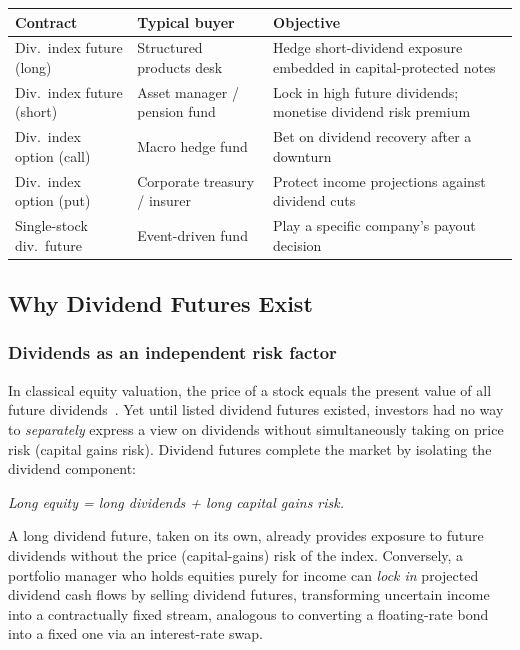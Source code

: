 \documentclass[12pt,a4paper]{article}
\begin{document}
\begin{center}
\small
\begin{tabular}{p{3.8cm}p{4.2cm}p{4.8cm}}
\toprule
\textbf{Contract} & \textbf{Typical buyer} & \textbf{Objective} \\
\midrule
Div.\ index future (long)
  & Structured products desk
  & Hedge short-dividend exposure embedded in capital-protected notes \\[3pt]
Div.\ index future (short)
  & Asset manager / pension fund
  & Lock in high future dividends; monetise dividend risk premium \\[3pt]
Div.\ index option (call)
  & Macro hedge fund
  & Bet on dividend recovery after a downturn \\[3pt]
Div.\ index option (put)
  & Corporate treasury / insurer
  & Protect income projections against dividend cuts \\[3pt]
Single-stock div.\ future
  & Event-driven fund
  & Play a specific company's payout decision \\
\bottomrule
\end{tabular}
\end{center}
 
\subsection*{Why Dividend Futures Exist}
 
\subsubsection*{Dividends as an independent risk factor}
 
In classical equity valuation, the price of a stock equals the present value of all
future dividends~\cite{hull}.
Yet until listed dividend futures existed, investors had no way to \emph{separately}
express a view on dividends without simultaneously taking on price risk (capital gains
risk).
Dividend futures complete the market by isolating the dividend component:
 
\smallskip
\textit{Long equity = long dividends + long capital gains risk.}
 
\smallskip
A long dividend future, taken on its own, already provides exposure to future dividends
without the price (capital-gains) risk of the index.
Conversely, a portfolio manager who holds equities purely for income can \emph{lock in}
projected dividend cash flows by selling dividend futures, transforming uncertain income
into a contractually fixed stream, analogous to converting a floating-rate bond into
a fixed one via an interest-rate swap.
 
\end{document}

